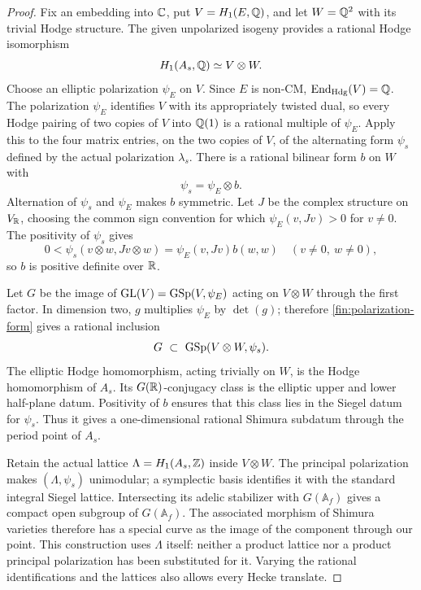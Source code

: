 \begin{proof}
Fix an embedding into $\mathbb C$, put $V=H_1(E,\mathbb Q)$, and let $W=\mathbb Q^2$
with its trivial Hodge structure.  The given unpolarized isogeny
provides a rational Hodge isomorphism
\begin{equation}\label{fin:tensor-decomposition}
 H_1(A_s,\mathbb Q)\simeq V\otimes W.
\end{equation}
Choose an elliptic polarization $\psi_E$ on $V$.  Since $E$ is non-CM,
$\operatorname{End}_{\mathrm{Hdg}}(V)=\mathbb Q$.  The polarization $\psi_E$ identifies
$V$ with its appropriately twisted dual, so every Hodge pairing of
two copies of $V$ into $\mathbb Q(1)$ is a rational multiple of $\psi_E$.
Apply this to the four matrix entries, on the two copies of $V$, of
the alternating form $\psi_s$ defined by the actual polarization
$\lambda_s$.  There is a rational bilinear form $b$ on $W$ with
\begin{equation}\label{fin:polarization-form}
 \psi_s=\psi_E\otimes b.
\end{equation}
Alternation of $\psi_s$ and $\psi_E$ makes $b$ symmetric.  Let $J$
be the complex structure on $V_{\mathbb R}$, choosing the common sign
convention for which $\psi_E(v,Jv)>0$ for $v\ne0$.
The positivity of $\psi_s$ gives
\[
 0<\psi_s(v\otimes w,Jv\otimes w)
   =\psi_E(v,Jv)b(w,w)
 \quad (v\ne0,\ w\ne0),
\]
so $b$ is positive definite over $\mathbb R$.

Let $G$ be the image of
$\operatorname{GL}(V)=\operatorname{GSp}(V,\psi_E)$ acting on $V\otimes W$ through the first
factor.  In dimension two, $g$ multiplies $\psi_E$ by $\det(g)$;
therefore \eqref{fin:polarization-form} gives a rational inclusion
\[
 G\ \subset\ \GSp(V\otimes W,\psi_s).
\]
The elliptic Hodge homomorphism, acting trivially on $W$, is the
Hodge homomorphism of $A_s$.  Its $G(\mathbb R)$-conjugacy class is the
elliptic upper and lower half-plane datum.  Positivity of $b$ ensures
that this class lies in the Siegel datum for $\psi_s$.  Thus it gives
a one-dimensional rational Shimura subdatum through the period
point of $A_s$.

Retain the actual lattice $\Lambda=H_1(A_s,\mathbb Z)$ inside
$V\otimes W$.  The principal polarization makes
$(\Lambda,\psi_s)$ unimodular; a symplectic basis identifies it with
the standard integral Siegel lattice.  Intersecting its adelic
stabilizer with $G(\mathbb A_f)$ gives a compact open subgroup of
$G(\mathbb A_f)$.  The associated morphism of Shimura varieties
therefore has a special curve as the image of the component through
our point.  This construction uses $\Lambda$ itself: neither a
product lattice nor a product principal polarization has been
substituted for it.  Varying the rational identifications and the
lattices also allows every Hecke translate.


\end{proof}
